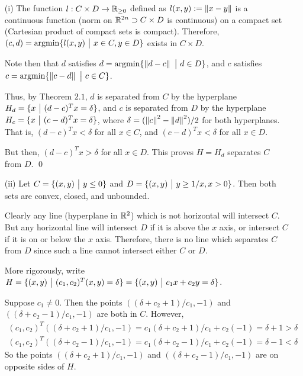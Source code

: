 \documentclass[10pt]{article}
\begin{document}
\begin{solution}

\begin{enumerate}
    \item[(i)] 
        The function \( l: C\times D \to \mathbb{R}_{\geq 0} \) defined as \(  l(x,y) := \left\lVert x-y\right\rVert \) is a continuous function (norm on \( \mathbb{R}^{2n} \supset C\times D \) is continuous) on a compact set (Cartesian product of compact sets is compact). Therefore, \( (c,d) = \operatorname{argmin}\{ l(x,y) ~\big|~ x\in C, y\in D \} \) exists in \( C\times D \).

        Note then that \( d \) satisfies \( d = \operatorname{argmin}\{\left\lVert d-c\right\rVert ~\big|~ d\in D \} \), and \( c \) satisfies \( c=\operatorname{argmin}\{\left\lVert c-d\right\rVert ~\big|~ c\in C\} \).

        Thus, by Theorem \( 2.1 \), \( d \) is separated from \( C \) by the hyperplane \( H_d = \{ x ~\big|~ (d-c)^Tx = \delta \}  \), and \( c \) is separated from \( D \) by the hyperplane \( H_c = \{x ~\big|~ (c-d)^Tx = \delta \} \), where \( \delta = (\left\lVert c\right\rVert^2-\left\lVert d\right\rVert^2)/2 \) for both hyperplanes.
        That is, \( (d-c)^T x < \delta  \) for all \( x\in C \), and \( (c-d)^Tx < \delta \) for all \( x\in D \). 
        
        But then, \( (d-c)^T x > \delta \) for all \( x\in D \). This proves \( H = H_d \) separates \( C \) from \( D \). \qed
     


    \item[(ii)] Let \( C = \{ (x,y) ~\big|~ y\leq 0 \} \) and \( D = \{ (x,y) ~\big|~ y \geq 1/x, x > 0 \} \). Then both sets are convex, closed, and unbounded.
       
        Clearly any line (hyperplane in \( \mathbb{R}^2 \)) which is not horizontal will intersect \( C \). But any horizontal line will intersect \( D \) if it is above the \( x \) axis, or intersect \( C \) if it is on or below the \( x \) axis. Therefore, there is no line which separates \( C \) from \( D \) since such a line cannot intersect either \( C \) or \( D \).

        More rigorously, write \( H = \{(x,y) ~\big|~ (c_1,c_2)^T(x,y) = \delta \} = \{(x,y) ~\big|~ c_1x+c_2y = \delta \} \).

        Suppose \( c_1 \neq 0 \). Then the points \( ((\delta+c_2+1)/c_1,-1) \) and \( ((\delta+c_2-1)/c_1,-1) \) are both in \( C \). However, 
        \begin{align*}
            (c_1,c_2)^T((\delta+c_2+1)/c_1,-1) = c_1(\delta + c_2 + 1)/c_1 + c_2(-1) = \delta + 1 > \delta \\
            (c_1,c_2)^T((\delta+c_2-1)/c_1,-1) = c_1(\delta + c_2 - 1)/c_1 + c_2(-1) = \delta - 1 < \delta 
        \end{align*}
        So the points \( ((\delta+c_2+1)/c_1,-1) \) and \( ((\delta+c_2-1)/c_1,-1) \) are on opposite sides of \( H \).


\end{enumerate}
\end{solution}
\end{document}
